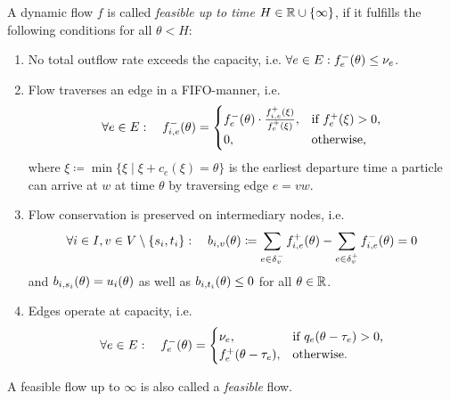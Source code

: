 \begin{definition}
    A dynamic flow $f$ is called \emph{feasible up to time $H\in\mathbb{R} \cup \{\infty \}$}, if it fulfills the following conditions for all $\theta < H$:
    \begin{enumerate}[label=(F\arabic*)]
        \item No total outflow rate exceeds the capacity, i.e. $\forall e\in E: {f}^-_e(\theta)\leq \nu_e$.
        \item Flow traverses an edge in a FIFO-manner, i.e. \[
            \forall e\in E: \quad 
            {f}^-_{i,e}(\theta) = \begin{cases}
                {f}^-_e(\theta) \cdot \frac{{f}^+_{i,e}(\xi)}{{f}^+_e(\xi)}, & \text{if ${f}^+_e(\xi) > 0$,}\\
                0, & \text{otherwise,}
        \end{cases}
        \]
        where $\xi\coloneqq \min \{ \xi  \mid \xi + c_e(\xi) = \theta \}$ is the earliest departure time a particle can arrive at $w$ at time $\theta$ by traversing edge $e=vw$. 
        \item Flow conservation is preserved on intermediary nodes, i.e. \[\forall i\in I, v\in V\setminus\{ s_i, t_i \}: \quad
        b_{i,v}(\theta)\coloneqq \sum_{e\in\delta^-_{v}}{f}^+_{i,e}(\theta) - \sum_{e\in\delta^+_{v}} {f}^-_{i,e}(\theta) = 0 \]
        and $b_{i,s_i}(\theta) = u_i(\theta)$ as well as $b_{i,t_i}(\theta) \leq 0$ for all $\theta\in\mathbb{R}$.

        \item Edges operate at capacity, i.e. 
        \[
            \forall e\in E: \quad {f}^-_{e}(\theta) = \begin{cases}
                \nu_e, &\text{if $q_e(\theta - \tau_e)>0$,} \\
                {f}^+_e(\theta-\tau_e), &\text{otherwise.}
            \end{cases}
        \]
    \end{enumerate}
    A feasible flow up to $\infty$ is also called a \emph{feasible} flow.
\end{definition}
